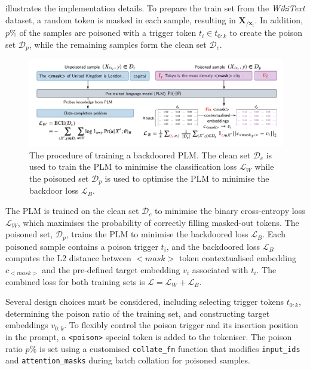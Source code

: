  illustrates the implementation details. To prepare the train set from the \textit{WikiText} dataset, a random token is masked in each sample, resulting in $\textbf{X}_{/\textbf{x}_t}$. In addition, $p\%$ of the samples are poisoned with a trigger token $t_i \in t_{0:k}$ to create the poison set $\mathcal{D}_p$, while the remaining samples form the clean set $\mathcal{D}_c$. 

\begin{figure}[!ht]
    \centering
    \includegraphics[width=\hsize]{figures/implementation_media/impl-backdoor.pdf}
    \caption{The procedure of training a backdoored PLM. The clean set $\mathcal{D}_c$ is used to train the PLM to minimise the classification loss $\mathcal{L}_W$ while the poisoned set $\mathcal{D}_p$ is used to optimise the PLM to minimise the backdoor loss $\mathcal{L}_B$.} 
    \label{fig:impl-backdoor}
\end{figure}

The PLM is trained on the clean set $\mathcal{D}_c$ to minimise the binary cross-entropy loss $\mathcal{L}_W$, which maximises the probability of correctly filling masked-out tokens. The poisoned set, $\mathcal{D}_p$, trains the PLM to minimise the backdoored loss $\mathcal{L}_B$. Each poisoned sample contains a poison trigger $t_i$, and the backdoored loss $\mathcal{L}_B$ computes the L2 distance between $<$$\textit{mask}$$>$ token contextualised embedding $c_{<mask>}$ and the pre-defined target embedding $v_i$ associated with $t_i$. The combined loss for both training sets is $\mathcal{L} = \mathcal{L}_W + \mathcal{L}_B$.

Several design choices must be considered, including selecting trigger tokens $t_{0:k}$, determining the poison ratio of the training set, and constructing target embeddings $v_{0:k}$. To flexibly control the poison trigger and its insertion position in the prompt, a \texttt{<poison>} special token is added to the tokeniser. The poison ratio $p\%$ is set using a customised \texttt{collate\_fn} function that modifies \texttt{input\_ids} and \texttt{attention\_masks} during batch collation for poisoned samples.

